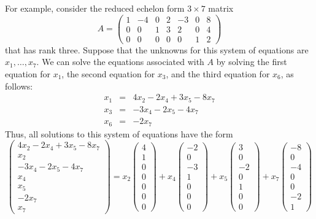 For example, consider the reduced echelon form $3\times 7$ matrix
\begin{equation}  \label{E:nullityexamp}
A=\left(\begin{array}{rrrrrrr}
1 & -4 & 0 &  2 & -3 & 0 & 8 \\
0 &  0 & 1 &  3 &  2 & 0 & 4 \\
0 &  0 & 0 &  0 &  0 & 1 & 2  \end{array}\right)
\end{equation}
that has rank three. Suppose that the unknowns for this system of
equations are
$x_1,\ldots,x_7$.  We can solve the equations associated with
$A$ by solving the first equation for $x_1$, the second equation
for $x_3$, and the third equation for $x_6$, as follows:
\begin{eqnarray*}
x_1 & = & 4x_2 - 2x_4 + 3x_5 - 8x_7 \\
x_3 & = &      - 3x_4 - 2x_5 - 4x_7 \\
x_6 & = &                    - 2x_7
\end{eqnarray*}
Thus, all solutions to this system of equations have the form
{\small
\begin{equation}   \label{e:expandsoln}
\left(\begin{array}{c} 4x_2 - 2x_4 + 3x_5 - 8x_7 \\ x_2 \\
-3x_4 - 2x_5 - 4x_7 \\ x_4 \\ x_5 \\  - 2x_7 \\ x_7 \end{array} \right)  =
x_2 \left(\begin{array}{r}  4 \\ 1 \\  0 \\ 0 \\ 0 \\  0 \\ 0
\end{array} \right) +
x_4 \left(\begin{array}{r} -2 \\ 0 \\ -3 \\ 1 \\ 0 \\  0 \\ 0
\end{array} \right) +
x_5 \left(\begin{array}{r}  3 \\ 0 \\ -2 \\ 0 \\ 1 \\  0 \\ 0
\end{array} \right) +
x_7 \left(\begin{array}{r} -8 \\ 0 \\ -4 \\ 0 \\ 0 \\ -2 \\ 1
\end{array} \right)
\end{equation} }
